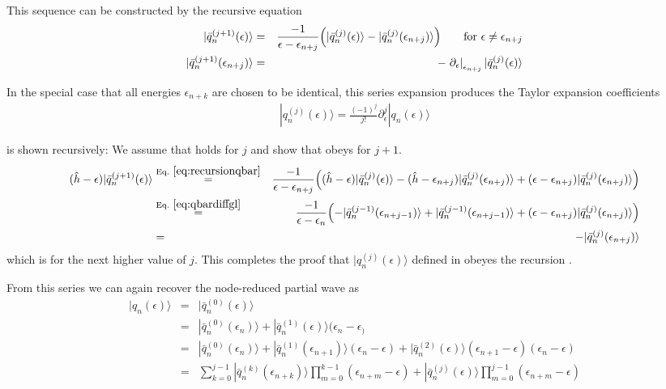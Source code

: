 \documentclass[11pt,a4paper]{report}
\begin{document}
This sequence can be constructed by the recursive equation
\begin{eqnarray}
|\bar{q}_{n}^{(j+1)}(\epsilon)\rangle&=&
\frac{-1}{\epsilon-\epsilon_{n+j}}
\Bigl(|\bar{q}_n^{(j)}(\epsilon)\rangle
-|\bar{q}_n^{(j)}(\epsilon_{n+j})\rangle\Bigr)
\qquad\text{for $\epsilon\ne\epsilon_{n+j}$}
\nonumber\\
|\bar{q}_{n}^{(j+1)}(\epsilon_{n+j})\rangle&=&
-\left.\partial_\epsilon\right|_{\epsilon_{n+j}}|\bar{q}_n^{(j)}(\epsilon)\rangle
\label{eq:recursionqbar}
\end{eqnarray}

In the special case that all energies $\epsilon_{n+k}$ are chosen to
be identical, this series expansion produces the Taylor expansion
coefficients
\begin{eqnarray}
|q_n^{(j)}(\epsilon)\rangle=
\frac{(-1)^j}{j!}\partial_\epsilon^j|q_n(\epsilon)\rangle
\label{eq:taylorexpansioncoefficientsqn}
\end{eqnarray}



 is shown recursively: We assume that
 holds for $j$ and show that  
obeys  for $j+1$.
\begin{eqnarray}
(\hat{h}-\epsilon)|\bar{q}^{(j+1)}_{n}(\epsilon)\rangle
&\eqrel{eq:recursionqbar}{=}&
\frac{-1}{\epsilon-\epsilon_{n+j}}
\Bigl((\hat{h}-\epsilon)|\bar{q}_n^{(j)}(\epsilon)\rangle
-(\hat{h}-\epsilon_{n+j})|\bar{q}_n^{(j)}(\epsilon_{n+j})\rangle
+(\epsilon-\epsilon_{n+j})|\bar{q}_n^{(j)}(\epsilon_{n+j})\rangle
\Bigr)
\nonumber\\
&\eqrel{eq:qbardiffgl}{=}&
\frac{-1}{\epsilon-\epsilon_n}
\Bigl(
-|\bar{q}_n^{(j-1)}(\epsilon_{n+j-1})\rangle
+|\bar{q}_n^{(j-1)}(\epsilon_{n+j-1})\rangle
+(\epsilon-\epsilon_{n+j})|\bar{q}_n^{(j)}(\epsilon_{n+j})\rangle
\Bigr)
\nonumber\\
&=&
-|\bar{q}_n^{(j)}(\epsilon_{n+j})\rangle
\end{eqnarray}
which is  for the next higher value of $j$. This
completes the proof that $|q_{n}^{(j)}(\epsilon)\rangle$ defined in
 obeyes the recursion .



From this series we can again recover the node-reduced partial wave as
\begin{eqnarray}
|q_n(\epsilon)\rangle&=&|\bar{q}_n^{(0)}(\epsilon)\rangle
\nonumber\\
&=&|\bar{q}_n^{(0)}(\epsilon_n)\rangle
+|\bar{q}_{n}^{(1)}(\epsilon)\rangle(\epsilon_n-\epsilon_)
\nonumber\\
&=&|\bar{q}_n^{(0)}(\epsilon_n)\rangle
+|\bar{q}_{n}^{(1)}(\epsilon_{n+1})\rangle(\epsilon_n-\epsilon)
+|\bar{q}_{n}^{(2)}(\epsilon)\rangle
(\epsilon_{n+1}-\epsilon)(\epsilon_{n}-\epsilon)
\nonumber\\
&=&\sum_{k=0}^{j-1}
|\bar{q}_{n}^{(k)}(\epsilon_{n+k})\rangle
\prod_{m=0}^{k-1}(\epsilon_{n+m}-\epsilon)
+|\bar{q}_n^{(j)}(\epsilon)\rangle
\prod_{m=0}^{j-1}(\epsilon_{n+m}-\epsilon)
\end{eqnarray}
\end{document}
